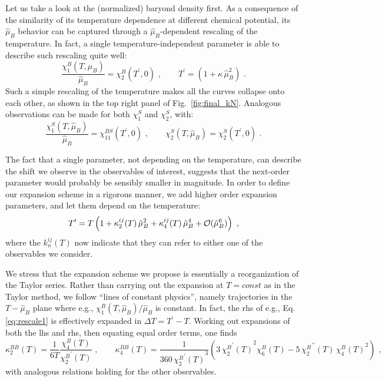 \documentclass[a4paper,11pt]{article}
\newcommand \hmu {\hat{\mu}}
\newcommand{\calO}{{\cal O}}
\begin{document}
Let us take a look at the (normalized) baryond density first. As a consequence of the 
similarity of its temperature dependence at different chemical potential, its $\hmu_B$ 
behavior can be captured through a $\hmu_B$-dependent rescaling of the temperature. 
In fact, a single temperature-independent parameter is able to describe such rescaling 
quite well:
\begin{equation} \label{eq:rescale1}
\frac{\chi_1^B(T,\hmu_B)}{\hmu_B} = \chi_2^B (T^\prime, 0) \, \, , \qquad T^\prime = (1 + \kappa \, \hmu_B^2) \, \, .
\end{equation} 
Such a simple rescaling of the temperature makes all the curves collapse onto each 
other, as shown in the top right panel of Fig.~\ref{fig:final_kN}. Analogous observations 
can be made for both $\chi_1^S$ and $\chi_2^S$, with:
\begin{equation} \label{eq:rescaleSTR}
\frac{\chi_1^S(T,\hmu_B)}{\hmu_B} = \chi_{11}^{BS} (T^\prime, 0) \, \, , \qquad \chi_2^S(T,\hmu_B) = \chi_2^S (T^\prime, 0) \, \, .
\end{equation} 

The fact that a single parameter, not depending on the temperature, can describe the 
shift we observe in the observables of interest, suggests that the next-order parameter
would probably be sensibly smaller in magnitude. In order to define our expansion 
scheme in a rigorous manner, we add higher order expansion parameters, and let
them depend on the temperature:
\begin{equation} \label{eq:Tprime2}
T^\prime = T \left(1 + \kappa_2^{ij} (T) \, \hmu_B^2 + \kappa_4^{ij} (T) \, \hmu_B^4 + \calO (\hmu_B^6) \right) \, \, ,
\end{equation}
where the $k_n^{ij}(T)$ now indicate that they can refer to either one of the observables 
we consider.

We stress that the expansion scheme we propose is essentially a reorganization of the 
Taylor series. Rather than carrying out the expansion at $T=\textit{const}$ as in the 
Taylor method, we follow ``lines of constant physics'', namely trajectories in the 
$T-\hmu_B$ plane where e.g.,  $\chi_1^B(T,\hmu_B)/\hmu_B$ is constant. In fact, the 
rhs of e.g., Eq.\eqref{eq:rescale1} is effectively expanded in $\Delta T = T^\prime - T$.
Working out expansions of both the lhs and rhs, then equating equal order terms, one 
finds
\begin{equation}\label{eq:k2k4}
\kappa_2^{BB} (T) = \frac{1}{6 T} \frac{\chi_4^B (T)}{{\chi_2^B}^\prime (T)} \, \, ,  \quad\quad
\kappa_4^{BB} (T) = \frac{1}{360 \, {{\chi_2^B}^\prime (T)}^3} \left( 3 \, {{\chi_2^B}^\prime (T)}^2 \chi_6^B (T) - 5 \, {\chi_2^B}^{\prime \prime}\!\! (T) \, {\chi_4^B (T)}^2 \right) \, \, ,
\end{equation}
with analogous relations holding for the other observables.
\end{document}
